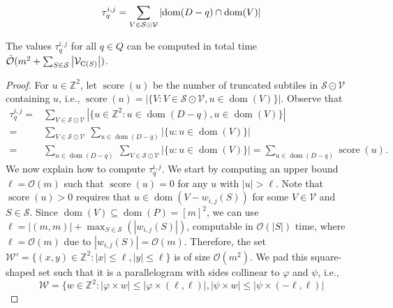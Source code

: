 \documentclass[twoside,leqno]{article}
\newcommand{\Z}{\mathbb{Z}}
\renewcommand{\O}{\mathcal{O}}
\newcommand{\tO}{\tilde{\mathcal{O}}}
\renewcommand{\S}{\mathcal{S}}
\newcommand{\V}{\mathcal{V}}
\newcommand{\W}{\mathcal{W}}
\renewcommand{\phi}{\varphi}
\DeclareMathOperator*{\score}{score}
\DeclareMathOperator*{\dom}{dom}
\newcommand{\absolute}[1]{\left\lvert#1\right\rvert}
\begin{document}
\begin{align}
\label{eq:group_by_gamma}
\tau_q^{i,j} = \sum_{V \in \S \odot \V} \absolute{\d{D-q} \cap \d{V}}
\end{align}


\begin{lemma}\label{primitive_conv}
The values $\tau_q^{i,j}$ for all $q \in Q$ can be computed in total time $\tO(m^2 + \sum_{S \in \S} \absolute{\V_{\getchar{S}}})$. 
\end{lemma}
\begin{proof}
For $u \in \Z^2$, let $\score(u)$ be the number of truncated subtiles in $\S \odot \V$ containing $u$, i.e., $\score(u) = \absolute{\{V : V \in \S \odot \V, u \in \dom(V)\}}$. Observe that
%
\begin{equation}
\begin{split}
\tau_q^{i,j} =&\sum_{V \in \S \odot \V} \absolute{\{u \in \Z^2 : u \in \dom(D-q), u \in \dom(V)\}}\\
=&\sum_{V \in \S \odot \V}\ \sum_{u \in \dom(D-q)}  \absolute{\{u : u \in \dom(V)\}}\\
=&\sum_{u \in \dom(D-q)}\ \sum_{V \in \S \odot \V} \absolute{\{u : u \in \dom(V)\}} = \sum_{u \in \dom(D-q)} \score(u).
\end{split}
\end{equation}
We now explain how to compute $\tau_q^{i,j}$. 
We start by computing an upper bound $\ell = \O(m)$ such that $\score(u) = 0$ for any $u$ with $\absolute{u} > \ell$. Note that $\score(u)>0$ requires that $u \in \dom(V - w_{i,j}(S))$ for some $V \in \V$ and $S \in \S$. Since $\dom(V) \subseteq \dom(P) = [m]^2$, we can use $\ell = \absolute{(m,m)} + \max_{S \in \S}(\absolute{w_{i, j}(S)})$, computable in $\O(\absolute{S})$ time, where $\ell = \O(m)$ due to $\absolute{w_{i,j}(S)} = \O(m)$.
%
Therefore, the set $\W' = \{(x,y) \in \Z^2 : \absolute{x} \le \ell, \absolute{y} \le \ell \}$ is of size $\O(m^2)$. 
We pad this square-shaped set such that it is a parallelogram with sides collinear to $\phi$ and $\psi$, i.e., 
$$\W = \{ w \in \mathbb Z^2 : \absolute{\phi \times w} \leq \absolute{\phi \times (\ell, \ell)}, \absolute{\psi \times w} \leq \absolute{\psi \times (-\ell, \ell)}$$


\end{proof}
\end{document}
